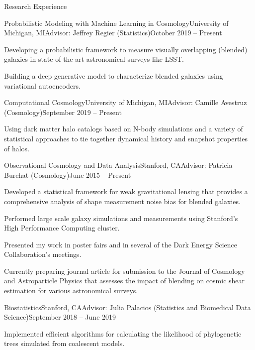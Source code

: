 \documentclass{resume} %
\begin{document}
\begin{rSection}{Research Experience}

\begin{rSubsection}{Probabilistic Modeling with Machine Learning in Cosmology}{University of Michigan, MI}{Advisor: Jeffrey Regier (Statistics)}{October 2019 -- Present}
\item Developing a probabilistic framework to measure visually overlapping (blended) galaxies in state-of-the-art astronomical surveys like LSST. 
\item Building a deep generative model to characterize blended galaxies using variational autoencoders. 
\end{rSubsection}

\begin{rSubsection}{Computational Cosmology}{University of Michigan, MI}{Advisor: Camille Avestruz (Cosmology)}{September 2019 -- Present}
\item Using dark matter halo catalogs based on N-body simulations and a variety of statistical approaches to tie together dynamical history and snapshot properties of halos. 
\end{rSubsection}

\begin{rSubsection}{Observational Cosmology and Data Analysis}{Stanford, CA}{Advisor: Patricia Burchat (Cosmology)}{June 2015 -- Present}
\item Developed a statistical framework for weak gravitational lensing that provides a comprehensive analysis of shape measurement noise bias for blended galaxies.
\item Performed large scale galaxy simulations and measurements using Stanford's High Performance Computing cluster.
\item Presented my work in poster fairs and in several of the Dark Energy Science Collaboration's meetings. 
\item Currently preparing journal article for submission to the Journal of Cosmology and Astroparticle Physics that assesses the impact of blending on cosmic shear estimation for various astronomical surveys. 
\end{rSubsection}

\begin{rSubsection}{Biostatistics}{Stanford, CA}{Advisor: Julia Palacios (Statistics and Biomedical Data Science)}{September 2018 -- June 2019}
\item Implemented efficient algorithms for calculating the likelihood of phylogenetic trees simulated from coalescent models.


\end{rSubsection}
\end{rSection}
\end{document}

